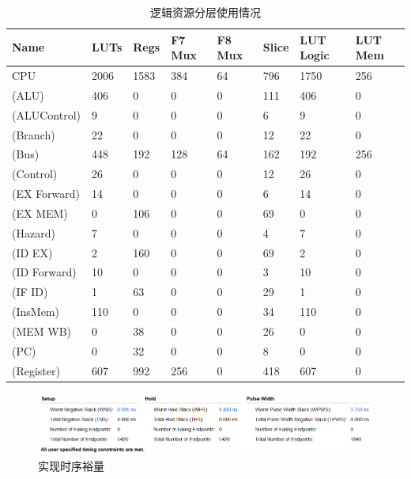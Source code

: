 \documentclass[a4paper]{article}
\begin{document}
\begin{table}[H]
    \centering
    \caption{逻辑资源分层使用情况}
    \label{tab:逻辑资源分层使用情况}
    \begin{tabular}{llllllll}
        \toprule
        Name         & LUTs & Regs & F7 Mux & F8 Mux & Slice & LUT Logic & LUT Mem \\
        \midrule
        CPU          & 2006 & 1583 & 384    & 64     & 796   & 1750      & 256     \\
        (ALU)        & 406  & 0    & 0      & 0      & 111   & 406       & 0       \\
        (ALUControl) & 9    & 0    & 0      & 0      & 6     & 9         & 0       \\
        (Branch)     & 22   & 0    & 0      & 0      & 12    & 22        & 0       \\
        (Bus)        & 448  & 192  & 128    & 64     & 162   & 192       & 256     \\
        (Control)    & 26   & 0    & 0      & 0      & 12    & 26        & 0       \\
        (EX Forward) & 14   & 0    & 0      & 0      & 6     & 14        & 0       \\
        (EX MEM)     & 0    & 106  & 0      & 0      & 69    & 0         & 0       \\
        (Hazard)     & 7    & 0    & 0      & 0      & 4     & 7         & 0       \\
        (ID EX)      & 2    & 160  & 0      & 0      & 69    & 2         & 0       \\
        (ID Forward) & 10   & 0    & 0      & 0      & 3     & 10        & 0       \\
        (IF ID)      & 1    & 63   & 0      & 0      & 29    & 1         & 0       \\
        (InsMem)     & 110  & 0    & 0      & 0      & 34    & 110       & 0       \\
        (MEM WB)     & 0    & 38   & 0      & 0      & 26    & 0         & 0       \\
        (PC)         & 0    & 32   & 0      & 0      & 8     & 0         & 0       \\
        (Register)   & 607  & 992  & 256    & 0      & 418   & 607       & 0       \\
        \bottomrule
    \end{tabular}
\end{table}

\begin{figure}[H]
    \centering
    \includegraphics[width=.9\textwidth]{../assets/imp_none_flatten_timing.png}
    \caption{实现时序裕量}
    \label{fig:实现时序裕量}
\end{figure}
\end{document}
